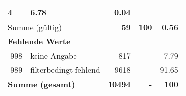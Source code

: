 \begin{longtable}{lXrrr}
       \num{4} &
       \num[round-mode=places,round-precision=2]{6.78} &
         \num[round-mode=places,round-precision=2]{0.04} \\
     \midrule
     \multicolumn{2}{l}{Summe (gültig)} &
       \textbf{\num{59}} &
     \textbf{\num{100}} &
       \textbf{\num[round-mode=places,round-precision=2]{0.56}} \\
     \multicolumn{5}{l}{\textbf{Fehlende Werte}}\\
       -998 &
       keine Angabe &
         \num{817} &
        - &
         \num[round-mode=places,round-precision=2]{7.79} \\
       -989 &
       filterbedingt fehlend &
         \num{9618} &
        - &
         \num[round-mode=places,round-precision=2]{91.65} \\
     \midrule
     \multicolumn{2}{l}{\textbf{Summe (gesamt)}} &
          \textbf{\num{10494}} &
        \textbf{-} &
        \textbf{\num{100}} \\
     \bottomrule
     \end{longtable}
     
